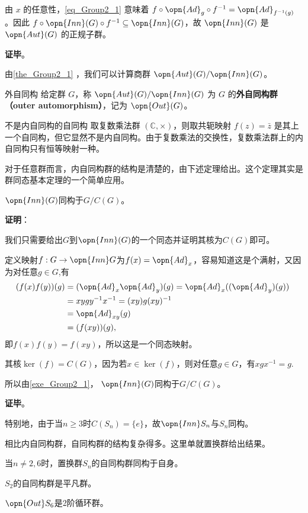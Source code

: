 由 $x$ 的任意性，\autoref{eq_Group2_1} 意味着 $f\circ \opn{Ad}_g\circ f^{-1}=\opn{Ad}_{f^{-1}(g)}$。因此 $f\circ\opn{Inn}(G)\circ f^{-1}\subseteq\opn{Inn}(G)$，故 $\opn{Inn}(G)$ 是 $\opn{Aut}(G)$ 的正规子群。

\textbf{证毕}。

由\autoref{the_Group2_1} ，我们可以计算商群 $\opn{Aut}(G)/\opn{Inn}(G)$。

\begin{definition}{外自同构}
给定群 $G$，称 $\opn{Aut}(G)/\opn{Inn}(G)$ 为 $G$ 的\textbf{外自同构群（outer automorphism）}，记为 $\opn{Out} (G)$。
\end{definition}

\begin{example}{不是内自同构的自同构}
取复数乘法群 $(\mathbb{C}, \times)$，则取共轭映射 $f(z)=\bar{z}$ 是其上一个自同构，但它显然不是内自同构。由于复数乘法的交换性，复数乘法群上的内自同构只有恒等映射一种。
\end{example}

对于任意群而言，内自同构群的结构是清楚的，由下述定理给出。这个定理其实是群同态基本定理的一个简单应用。

\begin{theorem}{}
$\opn{Inn}(G)$同构于$G/C(G)$。
\end{theorem}

\textbf{证明}：

我们只需要给出$G$到$\opn{Inn}(G)$的一个同态并证明其核为$C(G)$即可。

定义映射$f:G\to \opn{Inn} G$为$f(x)=\opn{Ad}_x$，容易知道这是个满射，又因为对任意$g\in G$,有
\begin{equation}
\begin{split}
(f(x)f(y))(g)&=(\opn{Ad}_x\opn{Ad}_y)(g)=\opn{Ad}_x((\opn{Ad}_y)(g))\\
&=xygy^{-1}x^{-1}=(xy)g(xy)^{-1}\\
&=\opn{Ad}_{xy}(g)\\
&=(f(xy))(g),
\end{split}~
\end{equation}
即$f(x)f(y)=f(xy)$，所以这是一个同态映射。

其核$\ker(f)=C(G)$，因为若$x\in\ker(f)$，则对任意$g\in G$，有$xgx^{-1}=g$.

所以由\autoref{exe_Group2_1}， $\opn{Inn}(G)$同构于$G/C(G)$。

\textbf{证毕}。

特别地，由于当$n\geq 3$时$C(S_n)=\{e\}$，故$\opn{Inn} S_n$与$S_n$同构。

相比内自同构群，自同构群的结构复杂得多。这里单就置换群给出结果。

\begin{theorem}{}
当$n\neq 2,6$时，置换群$S_n$的自同构群同构于自身。

$S_2$的自同构群是平凡群。

$\opn{Out} S_6$是2阶循环群。
\end{theorem}
